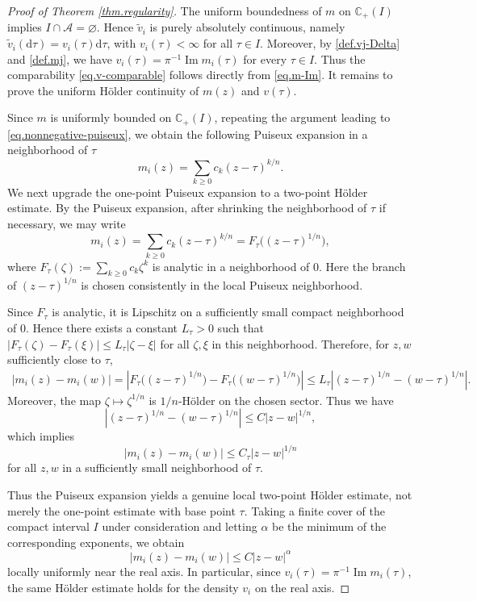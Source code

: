 \documentclass[11pt,twoside, a4paper]{article}
\numberwithin{equation}{section}
\numberwithin{figure}{section}
\theoremstyle{plain} %
\theoremstyle{definition}
\theoremstyle{remark}
\newcommand{\1} {\mspace{1 mu}}
\newcommand{\2} {\mspace{2 mu}}
\newcommand{\Cp} {\mathbb {C}_+}
\newcommand{\dd}{\mathrm{d}}
\DeclareMathOperator{\im}{Im}
\begin{document}
\bigskip
\begin{proof}[Proof of Theorem \ref{thm.regularity}]
    The uniform boundedness of \(m\) on $\Cp(I)$ implies \(I\cap\mathcal A=\varnothing\). 
    Hence $\tilde v_i$ is purely absolutely continuous, namely $\tilde v_i(\dd\tau)=v_i(\tau)\dd\tau$, with $v_i(\tau)<\infty$ for all $\tau\in I$. 
    Moreover, by \eqref{def.vj-Delta} and \eqref{def.mj}, we have $v_i(\tau)=\pi^{-1}\im m_i(\tau)$ for every $\tau\in I$. 
    Thus the comparability \eqref{eq.v-comparable} follows directly from \eqref{eq.m-Im}. 
    It remains to prove the uniform H\"older continuity of $m(z)$ and $v(\tau)$.
    
    Since $m$ is uniformly bounded on $\Cp(I)$, repeating the argument leading to \eqref{eq.nonnegative-puiseux}, we obtain the following Puiseux expansion in a neighborhood of $\tau$
    \[
      m_i(z)=\sum_{k\ge0}c_k(z-\tau)^{k/n}.
    \]
    We next upgrade the one-point Puiseux expansion to a two-point Hölder estimate. By the Puiseux expansion, after shrinking the neighborhood of \(\tau\) if necessary, we may write
    \[
      m_i(z)=\sum_{k\ge 0} c_k (z-\tau)^{k/n}
      =F_\tau\bigl((z-\tau)^{1/n}\bigr),
    \]
where
$
  F_\tau(\zeta):=\sum_{k\ge 0} c_k\zeta^k
$
is analytic in a neighborhood of \(0\). Here the branch of
\((z-\tau)^{1/n}\) is chosen consistently in the local Puiseux
neighborhood.

Since \(F_\tau\) is analytic, it is Lipschitz on a sufficiently small
compact neighborhood of \(0\). Hence there exists a constant
\(L_\tau>0\) such that
$
  |F_\tau(\zeta)-F_\tau(\xi)|
  \le L_\tau |\zeta-\xi|
$
for all \(\zeta,\xi\) in this neighborhood. Therefore, for \(z,w\)
sufficiently close to \(\tau\),
\[
\begin{aligned}
  |m_i(z)-m_i(w)|
  =
  \left|
    F_\tau\bigl((z-\tau)^{1/n}\bigr)
    -
    F_\tau\bigl((w-\tau)^{1/n}\bigr)
  \right| 
  \le
  L_\tau
  \left|
    (z-\tau)^{1/n}-(w-\tau)^{1/n}
  \right|.
\end{aligned}
\]
Moreover, the map \(\zeta\mapsto \zeta^{1/n}\) is \(1/n\)-Hölder on
the chosen sector. Thus we have
\[
  \left|
    (z-\tau)^{1/n}-(w-\tau)^{1/n}
  \right|
  \le C |z-w|^{1/n},
\]
which implies
\[
  |m_i(z)-m_i(w)|
  \le C_\tau |z-w|^{1/n}
\]
for all \(z,w\) in a sufficiently small neighborhood of \(\tau\).

Thus the Puiseux expansion yields a genuine local two-point Hölder
estimate, not merely the one-point estimate with base point \(\tau\).
Taking a finite cover of the compact interval $I$ under consideration and
letting \(\alpha\) be the minimum of the corresponding exponents, we
obtain
\[
  |m_i(z)-m_i(w)|\le C |z-w|^\alpha
\]
locally uniformly near the real axis. In particular, since
\(v_i(\tau)=\pi^{-1}\im m_i(\tau)\), the same Hölder estimate holds for
the density \(v_i\) on the real axis.


\end{proof}
\end{document}

